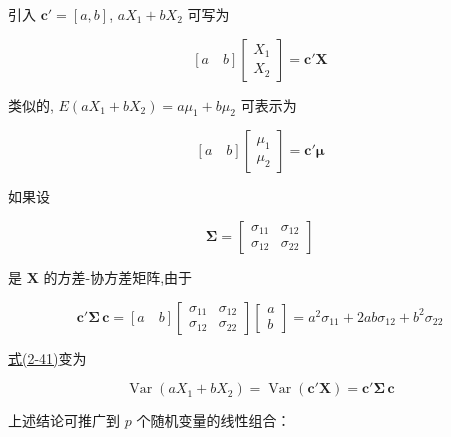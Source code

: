 引入 $\bm{c}' = [a,b]$, $aX_1 + bX_2$ 可写为

\[
[a \quad b]\begin{bmatrix} X_1 \\ X_2 \end{bmatrix} = \bm{c}'\bm{X}
\]

类似的, $E(aX_1 + bX_2) = a\mu_1 + b\mu_2$ 可表示为

\[
[a \quad b]\begin{bmatrix} \mu_1 \\ \mu_2 \end{bmatrix} = \bm{c}'\bm{\mu}
\]

如果设

\[
\bm{\Sigma} = \begin{bmatrix} \sigma_{11} & \sigma_{12} \\ \sigma_{12} & \sigma_{22} \end{bmatrix}
\]

是 $\bm{X}$ 的方差-协方差矩阵,由于

\[
\bm{c}'\bm{\Sigma}\,\bm{c} = [a \quad b]\begin{bmatrix} \sigma_{11} & \sigma_{12} \\ \sigma_{12} & \sigma_{22} \end{bmatrix}\begin{bmatrix} a \\ b \end{bmatrix} = a^2\sigma_{11} + 2ab\sigma_{12} + b^2\sigma_{22}
\]

\hyperref[eq:2-41]{式(2-41)}变为

\label{eq:2-42}
\begin{equation}
\operatorname{Var}(aX_1 + bX_2) = \operatorname{Var}(\bm{c}'\bm{X}) = \bm{c}'\bm{\Sigma}\,\bm{c} \tag{2-42}
\end{equation}

上述结论可推广到 $p$ 个随机变量的线性组合：
